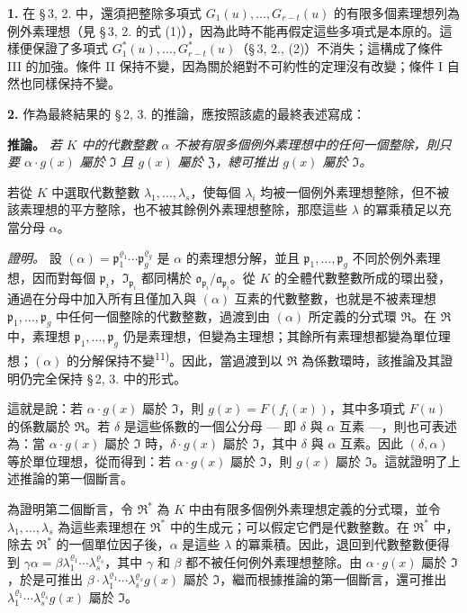\documentclass[11pt]{article}
\begin{document}
\medskip\noindent\textbf{1.}
在 \S\,3, 2. 中，還須把整除多項式 $G_1(u),\ldots,G_{r-t}(u)$ 的有限多個素理想列為例外素理想（見 \S\,3, 2. 的式 (1)），因為此時不能再假定這些多項式是本原的。這樣便保證了多項式 $G^*_1(u),\ldots,G^*_{r-t}(u)$（\S\,3, 2., (2)）不消失；這構成了條件 III 的加強。條件 II 保持不變，因為關於絕對不可約性的定理沒有改變；條件 I 自然也同樣保持不變。

\medskip\noindent\textbf{2.}
作為最終結果的 \S\,2, 3. 的推論，應按照該處的最終表述寫成：

\noindent\textbf{推論。}
\textit{若 $K$ 中的代數整數 $\alpha$ 不被有限多個例外素理想中的任何一個整除，則只要 $\alpha \cdot g(x)$ 屬於 $\mathfrak{I}$ 且 $g(x)$ 屬於 $\mathfrak{Z}$，總可推出 $g(x)$ 屬於 $\mathfrak{I}$。}

若從 $K$ 中選取代數整數 $\lambda_1,\ldots,\lambda_s$，使每個 $\lambda_i$ 均被一個例外素理想整除，但不被該素理想的平方整除，也不被其餘例外素理想整除，那麼這些 $\lambda$ 的冪乘積足以充當分母 $\alpha$。

\noindent\textit{證明。}
設 $(\alpha) = \mathfrak{p}_1^{\varrho_1} \cdots \mathfrak{p}_g^{\varrho_g}$ 是 $\alpha$ 的素理想分解，並且 $\mathfrak{p}_1,\ldots,\mathfrak{p}_g$ 不同於例外素理想，因而對每個 $\mathfrak{p}_i$，$\mathfrak{I}_{\mathfrak{p}_i}$ 都同構於 $\mathfrak{o}_{\mathfrak{p}_i}/\mathfrak{a}_{\mathfrak{p}_i}$。從 $K$ 的全體代數整數所成的環出發，通過在分母中加入所有且僅加入與 $(\alpha)$ 互素的代數整數，也就是不被素理想 $\mathfrak{p}_1,\ldots,\mathfrak{p}_g$ 中任何一個整除的代數整數，過渡到由 $(\alpha)$ 所定義的分式環 $\mathfrak{R}$。在 $\mathfrak{R}$ 中，素理想 $\mathfrak{p}_1,\ldots,\mathfrak{p}_g$ 仍是素理想，但變為主理想；其餘所有素理想都變為單位理想；$(\alpha)$ 的分解保持不變\textsuperscript{11)}。因此，當過渡到以 $\mathfrak{R}$ 為係數環時，該推論及其證明仍完全保持 \S\,2, 3. 中的形式。

這就是說：若 $\alpha \cdot g(x)$ 屬於 $\mathfrak{I}$，則 $g(x) = F(f_i(x))$，其中多項式 $F(u)$ 的係數屬於 $\mathfrak{R}$。若 $\delta$ 是這些係數的一個公分母 --- 即 $\delta$ 與 $\alpha$ 互素 ---，則也可表述為：當 $\alpha \cdot g(x)$ 屬於 $\mathfrak{I}$ 時，$\delta \cdot g(x)$ 屬於 $\mathfrak{I}$，其中 $\delta$ 與 $\alpha$ 互素。因此 $(\delta, \alpha)$ 等於單位理想，從而得到：若 $\alpha \cdot g(x)$ 屬於 $\mathfrak{I}$，則 $g(x)$ 屬於 $\mathfrak{I}$。這就證明了上述推論的第一個斷言。

為證明第二個斷言，令 $\mathfrak{R}^*$ 為 $K$ 中由有限多個例外素理想定義的分式環，並令 $\lambda_1,\ldots,\lambda_s$ 為這些素理想在 $\mathfrak{R}^*$ 中的生成元；可以假定它們是代數整數。在 $\mathfrak{R}^*$ 中，除去 $\mathfrak{R}^*$ 的一個單位因子後，$\alpha$ 是這些 $\lambda$ 的冪乘積。因此，退回到代數整數便得到 $\gamma\alpha = \beta \lambda_1^{\varrho_1} \cdots \lambda_s^{\varrho_s}$，其中 $\gamma$ 和 $\beta$ 都不被任何例外素理想整除。由 $\alpha \cdot g(x)$ 屬於 $\mathfrak{I}$，於是可推出 $\beta \cdot \lambda_1^{\varrho_1} \cdots \lambda_s^{\varrho_s} g(x)$ 屬於 $\mathfrak{I}$，繼而根據推論的第一個斷言，還可推出 $\lambda_1^{\varrho_1} \cdots \lambda_s^{\varrho_s} g(x)$ 屬於 $\mathfrak{I}$。
\end{document}
